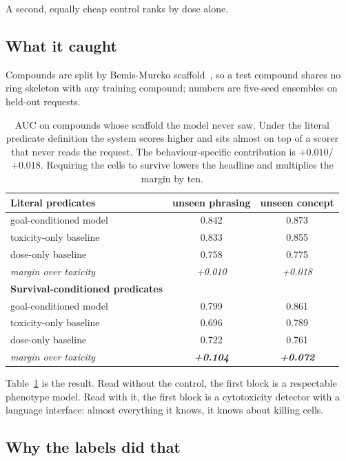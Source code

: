 \documentclass[letterpaper]{article}
\begin{document}
A second, equally cheap control ranks by dose alone.

\subsection{What it caught}

Compounds are split by Bemis-Murcko scaffold~\citep{bemis1996scaffold}, so a test
compound shares no ring skeleton with any training compound; numbers are five-seed
ensembles on held-out requests.

\begin{table}[t]
\centering
\small
\begin{tabular}{lcc}
\toprule
\textbf{Literal predicates} & unseen phrasing & unseen concept \\
\midrule
goal-conditioned model      & 0.842 & 0.873 \\
toxicity-only baseline      & 0.833 & 0.855 \\
dose-only baseline          & 0.758 & 0.775 \\
\textit{margin over toxicity} & \textit{+0.010} & \textit{+0.018} \\
\midrule
\textbf{Survival-conditioned predicates} & & \\
\midrule
goal-conditioned model      & 0.799 & 0.861 \\
toxicity-only baseline      & 0.696 & 0.789 \\
dose-only baseline          & 0.722 & 0.761 \\
\textit{margin over toxicity} & \textit{\textbf{+0.104}} & \textit{\textbf{+0.072}} \\
\bottomrule
\end{tabular}
\caption{AUC on compounds whose scaffold the model never saw. Under the literal
predicate definition the system scores higher and sits almost on top of a scorer that
never reads the request. The behaviour-specific contribution is $+0.010$/$+0.018$.
Requiring the cells to survive lowers the headline and multiplies the margin by ten.}
\label{tab:baselines}
\end{table}

Table~\ref{tab:baselines} is the result. Read without the control, the first block is a
respectable phenotype model. Read with it, the first block is a cytotoxicity detector
with a language interface: almost everything it knows, it knows about killing cells.

\subsection{Why the labels did that}
\end{document}
